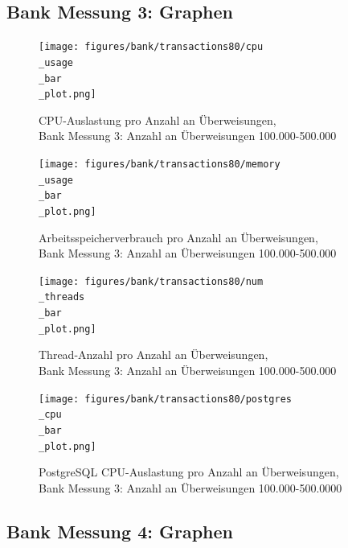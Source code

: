 \documentclass[fontsize=12pt,paper=a4,twoside=semi,parskip=half-,headsepline,headinclude]{scrreprt}
\begin{document}
\subsection{Bank Messung 3: Graphen}

\begin{figure}[H]
	\centering
	\texttt{[image: figures/bank/transactions80/cpu\\\_usage\\\_bar\\\_plot.png]}
	\caption{CPU-Auslastung pro Anzahl an Überweisungen,\\ Bank Messung 3: Anzahl an Überweisungen 100.000-500.000}
	\label{fig:bankTransactions80CPU}
\end{figure}

\begin{figure}[H]
	\centering
	\texttt{[image: figures/bank/transactions80/memory\\\_usage\\\_bar\\\_plot.png]}
	\caption{Arbeitsspeicherverbrauch pro Anzahl an Überweisungen,\\ Bank Messung 3: Anzahl an Überweisungen 100.000-500.000}
	\label{fig:bankTransactions80RAM}
\end{figure}

\begin{figure}[H]
	\centering
	\texttt{[image: figures/bank/transactions80/num\\\_threads\\\_bar\\\_plot.png]}
	\caption{Thread-Anzahl pro Anzahl an Überweisungen,\\ Bank Messung 3: Anzahl an Überweisungen 100.000-500.000}
	\label{fig:bankTransactions80Threads}
\end{figure}

\begin{figure}[H]
	\centering
	\texttt{[image: figures/bank/transactions80/postgres\\\_cpu\\\_bar\\\_plot.png]}
	\caption{PostgreSQL CPU-Auslastung pro Anzahl an Überweisungen,\\ Bank Messung 3: Anzahl an Überweisungen 100.000-500.0000}
	\label{fig:bankTransactions80PostgCPU}
\end{figure}

\subsection{Bank Messung 4: Graphen}
\label{subsec:bank4graph}
\end{document}
